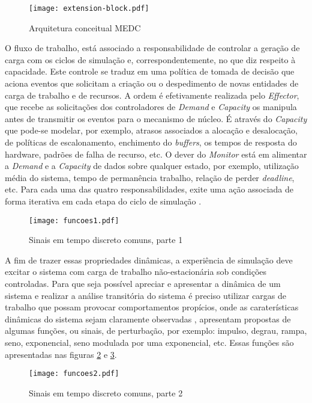 \begin{figure}[!htb]
	\centering
	\texttt{[image: extension-block.pdf]}
	\caption{Arquitetura conceitual MEDC}
	\label{fig:extension-block}
\end{figure}

O fluxo de trabalho, está associado a responsabilidade de controlar a geração de carga com os ciclos de simulação e, correspondentemente, no que diz respeito à capacidade. Este controle se traduz em uma política de tomada de decisão que aciona eventos que solicitam a criação ou o despedimento de novas entidades de carga de trabalho e de recursos. A ordem é efetivamente realizada pelo \textit{Effector}, que recebe as solicitações dos controladores de \textit{Demand} e \textit{Capacity} os manipula antes de transmitir os eventos para o mecanismo de núcleo. É através do \textit{Capacity} que pode-se modelar, por exemplo, atrasos associados a alocação e desalocação, de políticas de escalonamento, enchimento do \textit{buffers}, os tempos de resposta do hardware, padrões de falha de recurso, etc. O dever do \textit{Monitor} está em alimentar a \textit{Demand} e a \textit{Capacity} de dados sobre qualquer estado, por exemplo, utilização média do sistema, tempo de permanência trabalho, relação de perder \textit{deadline}, etc. Para cada uma das quatro responsabilidades, exite uma ação associada de forma iterativa em cada etapa do ciclo de simulação \cite{Lourenco2015}. 

\begin{figure}[!htb]
	\centering
	\texttt{[image: funcoes1.pdf]}
	\caption{Sinais em tempo discreto comuns, parte 1}
	\label{fig:funcoes1}
\end{figure}

A fim de trazer essas propriedades dinâmicas, a experiência de simulação deve excitar o sistema com carga de trabalho não-estacionária sob condições controladas. Para que seja possível apreciar e apresentar a dinâmica de um sistema e realizar a análise transitória do sistema é preciso utilizar cargas de trabalho que possam provocar comportamentos propícios, onde as caraterísticas dinâmicas do sistema sejam claramente observadas , apresentam propostas de algumas funções, ou sinais, de perturbação, por exemplo: impulso, degrau, rampa, seno, exponencial, seno modulada por uma exponencial, etc.  Essas funções são apresentadas nas figuras \ref{fig:funcoes1} e \ref{fig:funcoes2}.

\begin{figure}[!htb]
	\centering
	\texttt{[image: funcoes2.pdf]}
	\caption{Sinais em tempo discreto comuns, parte 2}
	\label{fig:funcoes2}
\end{figure}

